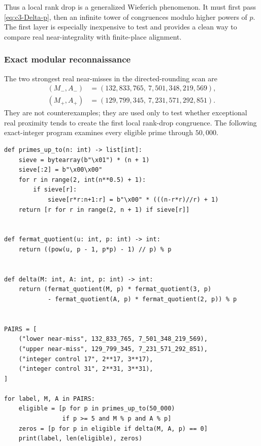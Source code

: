 \documentclass[11pt,oneside]{article}
\theoremstyle{definition}
\theoremstyle{remark}
\begin{document}
Thus a local rank drop is a generalized Wieferich phenomenon.  It must first pass
\eqref{eq:c3-Delta-p}, then an infinite tower of congruences modulo higher powers of $p$.
The first layer is especially inexpensive to test and provides a clean way to compare real
near-integrality with finite-place alignment.

\subsubsection*{Exact modular reconnaissance}

The two strongest real near-misses in the directed-rounding scan are
\begin{align*}
 (M_-,A_-)&=(132{,}833{,}765,\ 7{,}501{,}348{,}219{,}569),\\
 (M_+,A_+)&=(129{,}799{,}345,\ 7{,}231{,}571{,}292{,}851).
\end{align*}
They are not counterexamples; they are used only to test whether exceptional real proximity
tends to create the first local rank-drop congruence.  The following exact-integer program
examines every eligible prime through $50{,}000$.

\begin{lstlisting}[style=pythonstyle,caption={Fermat-quotient determinant scan.}]
def primes_up_to(n: int) -> list[int]:
    sieve = bytearray(b"\x01") * (n + 1)
    sieve[:2] = b"\x00\x00"
    for r in range(2, int(n**0.5) + 1):
        if sieve[r]:
            sieve[r*r:n+1:r] = b"\x00" * (((n-r*r)//r) + 1)
    return [r for r in range(2, n + 1) if sieve[r]]


def fermat_quotient(u: int, p: int) -> int:
    return ((pow(u, p - 1, p*p) - 1) // p) % p


def delta(M: int, A: int, p: int) -> int:
    return (fermat_quotient(M, p) * fermat_quotient(3, p)
            - fermat_quotient(A, p) * fermat_quotient(2, p)) % p


PAIRS = [
    ("lower near-miss", 132_833_765, 7_501_348_219_569),
    ("upper near-miss", 129_799_345, 7_231_571_292_851),
    ("integer control 17", 2**17, 3**17),
    ("integer control 31", 2**31, 3**31),
]

for label, M, A in PAIRS:
    eligible = [p for p in primes_up_to(50_000)
                if p >= 5 and M % p and A % p]
    zeros = [p for p in eligible if delta(M, A, p) == 0]
    print(label, len(eligible), zeros)
\end{lstlisting}
\end{document}
